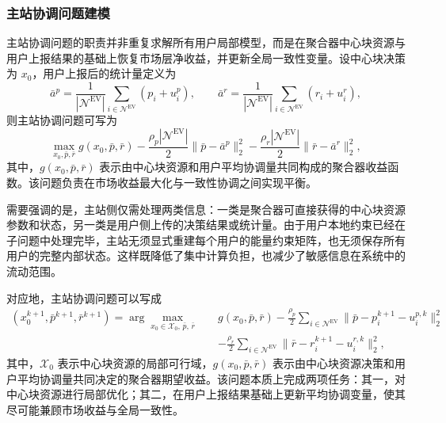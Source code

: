 \subsubsection{主站协调问题建模}
\label{subsubsec:vpp_admm_model_algorithm_master}

主站协调问题的职责并非重复求解所有用户局部模型，而是在聚合器中心块资源与用户上报结果的基础上恢复市场层净收益，并更新全局一致性变量。设中心块决策为 $x_0$，用户上报后的统计量定义为
\begin{equation}
\bar a^p = \frac{1}{|\mathcal{N}^{\mathrm{EV}}|} \sum_{i \in \mathcal{N}^{\mathrm{EV}}} (p_i + u_i^p),
\qquad
\bar a^r = \frac{1}{|\mathcal{N}^{\mathrm{EV}}|} \sum_{i \in \mathcal{N}^{\mathrm{EV}}} (r_i + u_i^r),
\end{equation}
则主站协调问题可写为
\begin{equation}
\max_{x_0, \bar p, \bar r}
g(x_0, \bar p, \bar r)
- \frac{\rho_p |\mathcal{N}^{\mathrm{EV}}|}{2} \|\bar p - \bar a^p\|_2^2
- \frac{\rho_r |\mathcal{N}^{\mathrm{EV}}|}{2} \|\bar r - \bar a^r\|_2^2,
\end{equation}
其中，$g(x_0, \bar p, \bar r)$ 表示由中心块资源和用户平均协调量共同构成的聚合器收益函数。该问题负责在市场收益最大化与一致性协调之间实现平衡。

需要强调的是，主站侧仅需处理两类信息：一类是聚合器可直接获得的中心块资源参数和状态，另一类是用户侧上传的决策结果或统计量。由于用户本地约束已经在子问题中处理完毕，主站无须显式重建每个用户的能量约束矩阵，也无须保存所有用户的完整内部状态。这样既降低了集中计算负担，也减少了敏感信息在系统中的流动范围。

对应地，主站协调问题可以写成
\begin{subequations}
\label{prob:vpp_admm_master}
\begin{align}
(x_0^{k+1}, \bar p^{k+1}, \bar r^{k+1}) = \arg\max_{x_0 \in \mathcal{X}_0,\, \bar p,\, \bar r}
\quad & g(x_0, \bar p, \bar r)
- \frac{\rho_p}{2} \sum_{i \in \mathcal{N}^{\mathrm{EV}}} \|\bar p - p_i^{k+1} - u_i^{p,k}\|_2^2 \\
& - \frac{\rho_r}{2} \sum_{i \in \mathcal{N}^{\mathrm{EV}}} \|\bar r - r_i^{k+1} - u_i^{r,k}\|_2^2, \label{prob:vpp_admm_master_obj}
\end{align}
\end{subequations}
其中，$\mathcal{X}_0$ 表示中心块资源的局部可行域，$g(x_0,\bar p,\bar r)$ 表示由中心块资源决策和用户平均协调量共同决定的聚合器期望收益。该问题本质上完成两项任务：其一，对中心块资源进行局部优化；其二，在用户上报结果基础上更新平均协调变量，使其尽可能兼顾市场收益与全局一致性。

